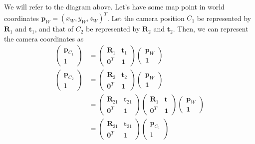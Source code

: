 \documentclass{article}
\theoremstyle{definition}
\theoremstyle{remark}
\theoremstyle{definition}
\begin{document}
We will refer to the diagram above. Let's have some map point in world coordinates $\mathbf{p}_W = (x_W, y_W, z_W)^T$. Let the camera position $C_1$ be represented by $\mathbf{R}_1$ and $\mathbf{t}_1$, and that of $C_2$ be represented by $\mathbf{R}_2$ and $\mathbf{t}_2$. Then, we can represent the camera coordinates as 
\begin{align*}
    \begin{pmatrix} \mathbf{p}_{C_1} \\ 1 \end{pmatrix} & = \begin{pmatrix} \mathbf{R}_1 & \mathbf{t}_1 \\ \mathbf{0}^T & \mathbf{1} \end{pmatrix} \begin{pmatrix} \mathbf{p}_W \\ \mathbf{1} \end{pmatrix} \\ 
    \begin{pmatrix} \mathbf{p}_{C_2} \\ 1 \end{pmatrix} & = \begin{pmatrix} \mathbf{R}_2 & \mathbf{t}_2 \\ \mathbf{0}^T & \mathbf{1} \end{pmatrix} \begin{pmatrix} \mathbf{p}_W \\ \mathbf{1} \end{pmatrix} \\
    & = \begin{pmatrix} \mathbf{R}_{21} & \mathbf{t}_{21} \\ \mathbf{0}^T & \mathbf{1} \end{pmatrix} \begin{pmatrix} \mathbf{R}_1 & \mathbf{t} \\ \mathbf{0}^T & \mathbf{1} \end{pmatrix} \begin{pmatrix} \mathbf{p}_W \\ \mathbf{1} \end{pmatrix} \\
    & = \begin{pmatrix} \mathbf{R}_{21} & \mathbf{t}_{21} \\ \mathbf{0}^T & \mathbf{1} \end{pmatrix} \begin{pmatrix} \mathbf{p}_{C_1} \\ 1 \end{pmatrix}
\end{align*} 
\end{document}
